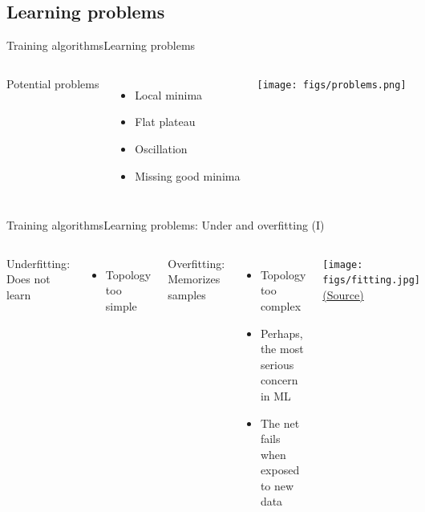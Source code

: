 \documentclass[10pt,compress]{beamer} %
\begin{document}
\subsection{Learning problems}
\begin{frame}{Training algorithms}{Learning problems}
    \begin{columns}
		Potential problems
		\begin{itemize}
		\item Local minima
		\item Flat plateau
		\item Oscillation
		\item Missing good minima
		\end{itemize}

	 \begin{center}
	\texttt{[image: figs/problems.png]}
 	\end{center}
   \end{columns}
\end{frame}

\begin{frame}{Training algorithms}{Learning problems: Under and overfitting (I)}
    \begin{columns}
		\alert{Underfitting}: Does not learn
            \begin{itemize}
                \item Topology too simple
            \end{itemize}

		\alert{Overfitting}: Memorizes samples
            \begin{itemize}
                \item Topology too complex
                \item Perhaps, the most serious concern in ML
                \item The net fails when exposed to new data
            \end{itemize}

            \begin{center}
			\texttt{[image: figs/fitting.jpg]}\\
			\scriptsize \href{https://www.youtube.com/watch?v=dBLZg-RqoLg}{(Source)}
            \end{center}
   \end{columns}
\end{frame}
\end{document}
